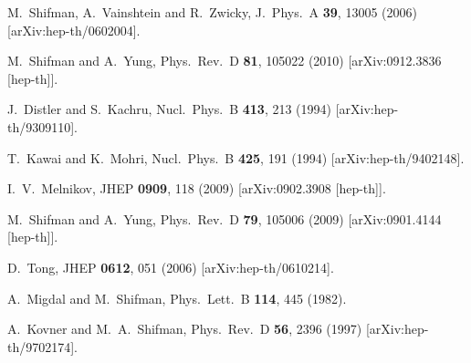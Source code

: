 \documentclass[epsfig,12pt]{article}
\begin{document}
\begin{thebibliography}{99}
  M.~Shifman, A.~Vainshtein and R.~Zwicky,
  J.\ Phys.\ A  {\bf 39}, 13005 (2006)
  [arXiv:hep-th/0602004].
  
  M.~Shifman and A.~Yung,
  Phys.\ Rev.\  D {\bf 81}, 105022 (2010)
  [arXiv:0912.3836 [hep-th]].
  
  J.~Distler and S.~Kachru,
  Nucl.\ Phys.\  B {\bf 413}, 213 (1994)
  [arXiv:hep-th/9309110].
  
  T.~Kawai and K.~Mohri,
  Nucl.\ Phys.\  B {\bf 425}, 191 (1994)
  [arXiv:hep-th/9402148].
  
  I.~V.~Melnikov,
  JHEP {\bf 0909}, 118 (2009)
  [arXiv:0902.3908 [hep-th]].
  
  M.~Shifman and A.~Yung,
  Phys.\ Rev.\  D {\bf 79}, 105006 (2009)
  [arXiv:0901.4144 [hep-th]].

  D.~Tong,
  JHEP {\bf 0612}, 051 (2006)
  [arXiv:hep-th/0610214].

  A.~Migdal and M.~Shifman,
  Phys.\ Lett.\  B {\bf 114}, 445 (1982).
  
  A.~Kovner and M.~A.~Shifman,
  Phys.\ Rev.\  D {\bf 56}, 2396 (1997)
  [arXiv:hep-th/9702174].

\end{thebibliography}
\end{document}
